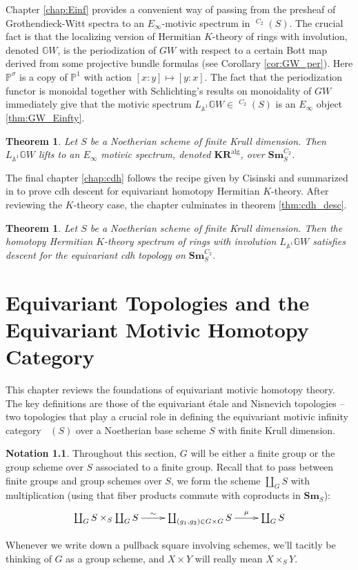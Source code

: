 \documentclass[edeposit,fullpage]{uiucthesis2009}
\newcommand{\mbb}{\mathbb}
\newcommand{\Sm}[1]{\mathbf{Sm}_{#1}}
\newcommand{\KR}{\mathbf{KR}^{\mathrm{alg}}}
\DeclareMathOperator{\SH}{\underline{SH}}
\DeclareMathOperator{\HH}{\underline{H}}
\theoremstyle{plain}
\numberwithin{lemma}{section}
\newtheorem{theorem}[lemma]{Theorem}
\theoremstyle{definition}
\newtheorem{notation}[lemma]{Notation}
\begin{document}
Chapter \ref{chap:Einf} provides a convenient way of passing from the
presheaf of Grothendieck-Witt spectra to an
$E_\infty$-motivic spectrum in $\SH^{C_2}(S)$. The crucial fact is that
the localizing version of Hermitian $K$-theory of rings with involution, denoted $\mbb
GW$, is the periodization of $GW$ with respect to a certain Bott map
derived from some projective bundle formulas (see Corollary \ref{cor:GW_per}). Here
$\mbb P^\sigma$ is a copy of $\mbb P^1$ with action $[x:y] \mapsto
[y:x]$. The fact that the periodization functor is monoidal together
with Schlichting's results on monoidality of $GW$ immediately give
that the motivic spectrum $L_{\mbb A^1}\mbb GW \in \SH^{C_2}(S)$ is an
$E_\infty$ object \ref{thm:GW_Einfty}.

\begin{theorem}
Let $S$ be a Noetherian scheme of finite Krull dimension. Then $L_{\mbb A^1}\mbb GW$ lifts to an $E_\infty$ motivic spectrum, denoted
$\KR$, over $\Sm{S}^{C_2}$.
\end{theorem}

The final chapter \ref{chap:cdh} follows the recipe given by Cisinski
and summarized in \cite{cdhdesc} to prove cdh descent for equivariant
homotopy Hermitian $K$-theory. After reviewing the $K$-theory case,
the chapter culminates in theorem \ref{thm:cdh_desc}.

\begin{theorem}
Let $S$ be a Noetherian scheme of finite Krull dimension. Then the
homotopy Hermitian $K$-theory spectrum of rings with involution $L_{\mbb A^1}\mbb
GW$ satisfies descent for the equivariant cdh topology on $\Sm{S}^{C_2}$.
\end{theorem}

\chapter{Equivariant Topologies and the Equivariant Motivic Homotopy Category}\label{chap:Eq_Top}

This chapter reviews the foundations of equivariant motivic homotopy
theory. The key definitions are those of the equivariant \'etale and
Nisnevich topologies -- two topologies that play a crucial role in
defining the equivariant motivic infinity category
$\HH(S)$ over a Noetherian base scheme $S$ with finite Krull dimension.

\begin{notation}
Throughout this section, $G$ will be either a finite group or the
group scheme over $S$ associated to a finite group. Recall that to pass between
finite groups and group schemes over $S$, we form the scheme
$\coprod_G S$ with multiplication (using that fiber products commute
with coproducts in $\Sm{S}$):
\[
\xymatrix{\coprod_G S \times_S \coprod_G S \ar[r]^-\sim &\coprod_{(g_1,g_2)\in G \times
  G} S \ar[r]^-{\mu}& \coprod_G S}
\]

Whenever we write down a pullback square involving schemes, we'll
tacitly be thinking of $G$ as a group scheme, and $X \times Y$ will
really mean $X \times_S Y$.
\end{notation}
\end{document}
